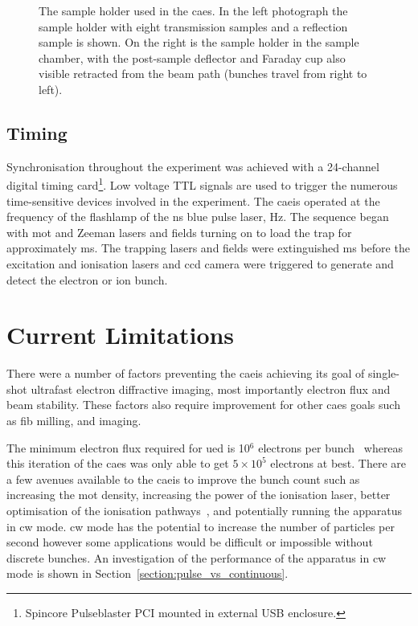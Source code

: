 \begin{figure}
\begin{subfigure}{0.49\linewidth}
    \end{subfigure}
    \caption[Sample holder.]{The sample holder used in the \gls{caes}. In the left photograph the sample holder with eight transmission samples and a reflection sample is shown. On the right is the sample holder in the sample chamber, with the post-sample deflector and Faraday cup also visible retracted from the beam path (bunches travel from right to left).}
    \label{figure:sample_holder}
\end{figure}

\subsection{Timing}\label{section:pulse_blaster}

Synchronisation throughout the experiment was achieved with a 24-channel digital timing card\footnote{Spincore Pulseblaster PCI mounted in external USB enclosure.}.
Low voltage TTL signals are used to trigger the numerous time-sensitive devices involved in the experiment.
The \gls{caeis} operated at the frequency of the flashlamp of the \unit[5]{ns} blue pulse laser, \unit[10]{Hz}.
The sequence began with \gls{mot} and Zeeman lasers and fields turning on to load the trap for approximately \unit[90]{ms}.
The trapping lasers and fields were extinguished \unit[5]{ms} before the excitation and ionisation lasers and \gls{ccd} camera were triggered to generate and detect the electron or ion bunch.

\section{Current Limitations}

There were a number of factors preventing the \gls{caeis} achieving its goal of single-shot ultrafast electron diffractive imaging, most importantly electron flux and beam stability.
These factors also require improvement for other \gls{caes} goals such as \gls{fib} milling, and imaging.

The minimum electron flux required for \gls{ued} is 10$^6$ electrons per bunch~\cite{van_oudheusden_compression_2010} whereas this iteration of the \gls{caes} was only able to get $5\times10^5$ electrons at best.
There are a few avenues available to the \gls{caeis} to improve the bunch count such as increasing the \gls{mot} density, increasing the power of the ionisation laser, better optimisation of the ionisation pathways~\cite{mcculloch_field_2017}, and potentially running the apparatus in \gls{cw} mode.
\Gls{cw} mode  has the potential to increase the number of particles per second however some applications would be difficult or impossible without discrete bunches.
An investigation of the performance of the apparatus in \gls{cw} mode is shown in Section~\ref{section:pulse_vs_continuous}.

